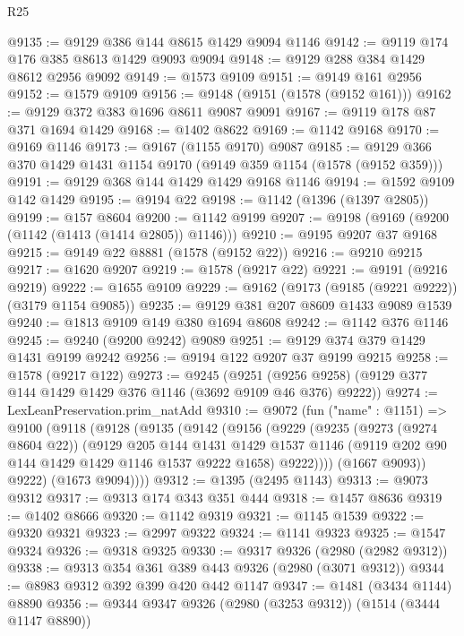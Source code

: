 \begin{lexlean}{R25}
\begin{coremodule}
@9135 := @9129 @386 @144 @8615 @1429 @9094 @1146
@9142 := @9119 @174 @176 @385 @8613 @1429 @9093 @9094
@9148 := @9129 @288 @384 @1429 @8612 @2956 @9092
@9149 := @1573 @9109
@9151 := @9149 @161 @2956
@9152 := @1579 @9109
@9156 := @9148 (@9151 (@1578 (@9152 @161)))
@9162 := @9129 @372 @383 @1696 @8611 @9087 @9091
@9167 := @9119 @178 @87 @371 @1694 @1429
@9168 := @1402 @8622
@9169 := @1142 @9168
@9170 := @9169 @1146
@9173 := @9167 (@1155 @9170) @9087
@9185 := @9129 @366 @370 @1429 @1431 @1154 @9170 (@9149 @359 @1154 (@1578 (@9152 @359)))
@9191 := @9129 @368 @144 @1429 @1429 @9168 @1146
@9194 := @1592 @9109 @142 @1429
@9195 := @9194 @22
@9198 := @1142 (@1396 (@1397 @2805))
@9199 := @157 @8604
@9200 := @1142 @9199
@9207 := @9198 (@9169 (@9200 (@1142 (@1413 (@1414 @2805)) @1146)))
@9210 := @9195 @9207 @37 @9168
@9215 := @9149 @22 @8881 (@1578 (@9152 @22))
@9216 := @9210 @9215
@9217 := @1620 @9207
@9219 := @1578 (@9217 @22)
@9221 := @9191 (@9216 @9219)
@9222 := @1655 @9109
@9229 := @9162 (@9173 (@9185 (@9221 @9222)) (@3179 @1154 @9085))
@9235 := @9129 @381 @207 @8609 @1433 @9089 @1539
@9240 := @1813 @9109 @149 @380 @1694 @8608
@9242 := @1142 @376 @1146
@9245 := @9240 (@9200 @9242) @9089
@9251 := @9129 @374 @379 @1429 @1431 @9199 @9242
@9256 := @9194 @122 @9207 @37 @9199 @9215
@9258 := @1578 (@9217 @122)
@9273 := @9245
    (@9251 (@9256 @9258) (@9129 @377 @144 @1429 @1429 @376 @1146 (@3692 @9109 @46 @376) @9222))
@9274 := LexLeanPreservation.prim_natAdd
@9310 := @9072
    (fun ("name" : @1151) =>
    @9100
      (@9118
        (@9128
          (@9135
            (@9142
              (@9156
                (@9229
                  (@9235
                    (@9273 (@9274 @8604 @22))
                    (@9129
                      @205
                      @144
                      @1431
                      @1429
                      @1537
                      @1146
                      (@9119 @202 @90 @144 @1429 @1429 @1146 @1537 @9222 @1658)
                      @9222))))
              (@1667 @9093))
            @9222)
          (@1673 @9094))))
@9312 := @1395 (@2495 @1143)
@9313 := @9073 @9312
@9317 := @9313 @174 @343 @351 @444
@9318 := @1457 @8636
@9319 := @1402 @8666
@9320 := @1142 @9319
@9321 := @1145 @1539
@9322 := @9320 @9321
@9323 := @2997 @9322
@9324 := @1141 @9323
@9325 := @1547 @9324
@9326 := @9318 @9325
@9330 := @9317 @9326 (@2980 (@2982 @9312))
@9338 := @9313 @354 @361 @389 @443 @9326 (@2980 (@3071 @9312))
@9344 := @8983 @9312 @392 @399 @420 @442 @1147
@9347 := @1481 (@3434 @1144) @8890
@9356 := @9344 @9347 @9326 (@2980 (@3253 @9312)) (@1514 (@3444 @1147 @8890))

\end{coremodule}
\end{lexlean}
